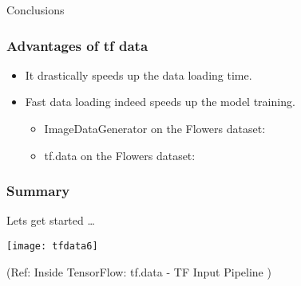 \begin{frame}
  \begin{center}
    {\Large Conclusions}
	
  \end{center}
\end{frame}

\begin{frame}[fragile]\frametitle{Advantages of tf data}
\begin{itemize}
\item It drastically speeds up the data loading time.
\item Fast data loading indeed speeds up the model training. 
\begin{itemize}
\item ImageDataGenerator on the Flowers dataset:
\item tf.data on the Flowers dataset:
\end{itemize}
\end{itemize}
\end{frame}

\begin{frame}[fragile]\frametitle{Summary}
Lets get started \ldots

\begin{center}
\texttt{[image: tfdata6]}

{\tiny (Ref: Inside TensorFlow: tf.data - TF Input Pipeline )}

\end{center}
\end{frame}